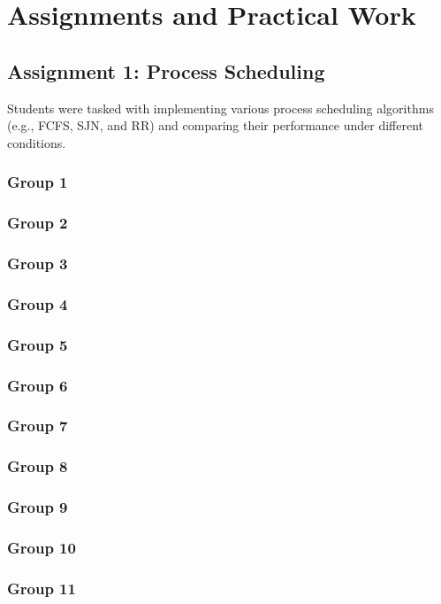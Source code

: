 \documentclass[12pt]{article}
\begin{document}
\section{Assignments and Practical Work}
\subsection{Assignment 1: Process Scheduling}
Students were tasked with implementing various process scheduling algorithms (e.g., FCFS, SJN, and RR) and comparing their performance under different conditions.

\subsubsection{Group 1}
\subsubsection{Group 2}
\subsubsection{Group 3}
\subsubsection{Group 4}
\subsubsection{Group 5}
\subsubsection{Group 6}
\subsubsection{Group 7}
\subsubsection{Group 8}
\subsubsection{Group 9}
\subsubsection{Group 10}
\subsubsection{Group 11}
\end{document}
